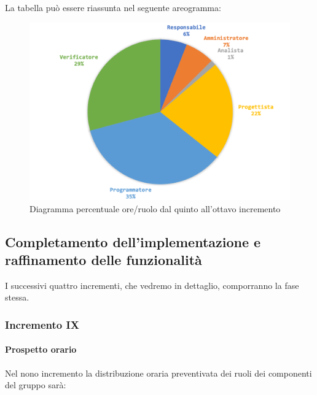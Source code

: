 	La tabella può essere riassunta nel seguente areogramma:
	\begin{figure}[H]
		\centering
		\includegraphics[width=0.8\linewidth]{./images/preventivo/incremento5-8-2.png}
		\caption{Diagramma percentuale ore/ruolo dal quinto all'ottavo incremento}
		\label{fig:diagramma costi ruolo incrementi V-VIII}
	\end{figure}	
		
		
	\pagebreak
	\subsection{Completamento dell'implementazione e raffinamento delle funzionalità}
	I successivi quattro incrementi, che vedremo in dettaglio, comporranno la fase stessa.  		
	\subsubsection{Incremento IX}
		\paragraph{Prospetto orario}
		Nel nono incremento la distribuzione oraria preventivata dei ruoli dei componenti del gruppo sarà:
		
